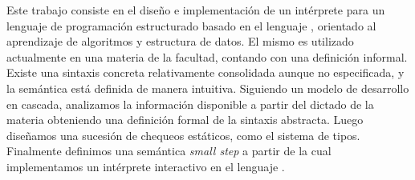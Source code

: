 Este trabajo consiste en el diseño e implementación de un intérprete para un lenguaje de programación estructurado basado en el lenguaje \Pascal{}, orientado al aprendizaje de algoritmos y estructura de datos.
El mismo es utilizado actualmente en una materia de la facultad, contando con una definición informal.
Existe una sintaxis concreta relativamente consolidada aunque no especificada, y la semántica está definida de manera intuitiva.
Siguiendo un modelo de desarrollo en cascada, analizamos la información disponible a partir del dictado de la materia obteniendo una definición formal de la sintaxis abstracta.
Luego diseñamos una sucesión de chequeos estáticos, como el sistema de
tipos.
Finalmente definimos una semántica \textit{small step} a partir de la cual implementamos un intérprete interactivo en el lenguaje \Haskell{}.